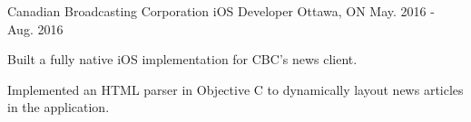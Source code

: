 \begin{cventries}
  \cventry
    {Canadian Broadcasting Corporation} %
    {iOS Developer} %
    {Ottawa, ON} %
    {May. 2016 - Aug. 2016} %
    {
      \begin{cvitems} %
        \item {Built a fully native iOS implementation for CBC’s news client.}
        \item {Implemented an HTML parser in Objective C to dynamically layout news articles in the application.}
      \end{cvitems}
    }       


\end{cventries}
